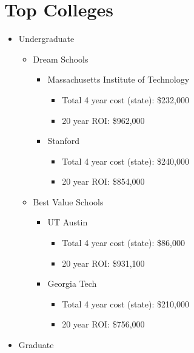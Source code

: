 \section{Top Colleges}
\begin{itemize}
    \item{Undergraduate} 
    \begin{itemize}
        \item{Dream Schools}
            \begin{itemize}
                \item{Massachusetts Institute of Technology}
                    \begin{itemize}
                        \item{Total 4 year cost (state):} \$232,000
                        \item{20 year ROI:} \$962,000
                    \end{itemize}
                \item{Stanford}
                    \begin{itemize}
                        \item{Total 4 year cost (state):} \$240,000 
                        \item{20 year ROI:} \$854,000
                    \end{itemize}
            \end{itemize}
        \item{Best Value Schools} 
            \begin{itemize}
                \item{UT Austin}
                    \begin{itemize}
                        \item{Total 4 year cost (state):} \$86,000 
                        \item{20 year ROI:} \$931,100
                    \end{itemize}
                \item{Georgia Tech}
                    \begin{itemize}
                        \item{Total 4 year cost (state):} \$210,000
                        \item{20 year ROI:} \$756,000
                    \end{itemize}
            \end{itemize}
    \end{itemize}
    \item{Graduate} 

\end{itemize}
